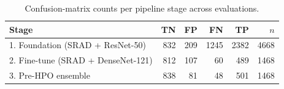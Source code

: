 \begin{table}[htbp]
  \centering
  \small
  \caption{Confusion-matrix counts per pipeline stage across evaluations.}
  \label{tab:stage-cm}
  \begin{tabular}{lrrrrr}
    \toprule
    \textbf{Stage} & \textbf{TN} & \textbf{FP} & \textbf{FN} & \textbf{TP} & \textbf{$n$} \\
    \midrule
    1. Foundation (SRAD + ResNet-50) & 832 & 209 & 1245 & 2382 & 4668 \\
    2. Fine-tune (SRAD + DenseNet-121) & 812 & 107 & 60 & 489 & 1468 \\
    3. Pre-HPO ensemble & 838 & 81 & 48 & 501 & 1468 \\
    \bottomrule
  \end{tabular}
\end{table}
